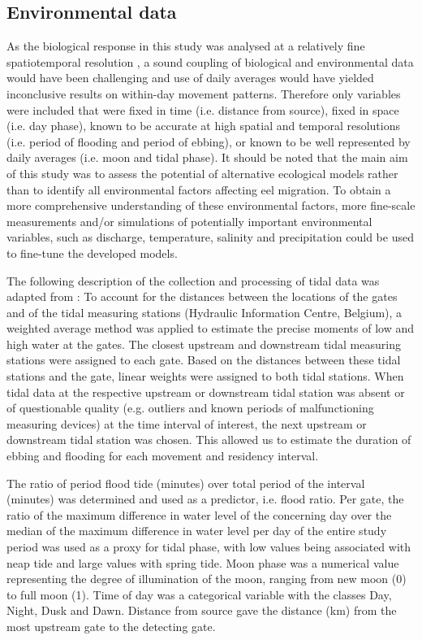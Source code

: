 \documentclass[preprint,12pt,authoryear]{elsarticle}
\begin{document}
\subsection{Environmental data}
\label{Environmental_data}
As the biological response in this study was analysed at a relatively fine spatiotemporal resolution \citep{Bultel2014,Verhelst2018}, a sound coupling of biological and environmental data would have been challenging and use of daily averages would have yielded inconclusive results on within-day movement patterns. Therefore only variables were included that were fixed in time (i.e. distance from source), fixed in space (i.e. day phase), known to be accurate at high spatial and temporal resolutions (i.e. period of flooding and period of ebbing), or known to be well represented by daily averages (i.e. moon and tidal phase). It should be noted that the main aim of this study was to assess the potential of alternative ecological models rather than to identify all environmental factors affecting eel migration. To obtain a more comprehensive understanding of these environmental factors, more fine-scale measurements and/or simulations of potentially important environmental variables, such as discharge, temperature, salinity and precipitation could be used to fine-tune the developed models. 

The following description of the collection and processing of tidal data was adapted from \cite{Verhelst2018}: To account for the distances between the locations of the gates and of the tidal measuring stations (Hydraulic Information Centre, Belgium), a weighted average method was applied to estimate the precise moments of low and high water at the gates. The closest upstream and downstream tidal measuring stations were assigned to each gate. Based on the distances between these tidal stations and the gate, linear weights were assigned to both tidal stations. When tidal data at the respective upstream or downstream tidal station was absent or of questionable quality (e.g. outliers and known periods of malfunctioning measuring devices) at the time interval of interest, the next upstream or downstream tidal station was chosen. This allowed us to estimate the duration of ebbing and flooding for each movement and residency interval. 

The ratio of period flood tide (minutes) over total period of the interval (minutes) was determined and used as a predictor, i.e. flood ratio. Per gate, the ratio of the maximum difference in water level of the concerning day over the median of the maximum difference in water level per day of the entire study period was used as a proxy for tidal phase, with low values being associated with neap tide and large values with spring tide. Moon phase was a numerical value representing the degree of illumination of the moon, ranging from new moon (0) to full moon (1). Time of day was a categorical variable with the classes Day, Night, Dusk and Dawn. Distance from source gave the distance (km) from the most upstream gate to the detecting gate. 
\end{document}
